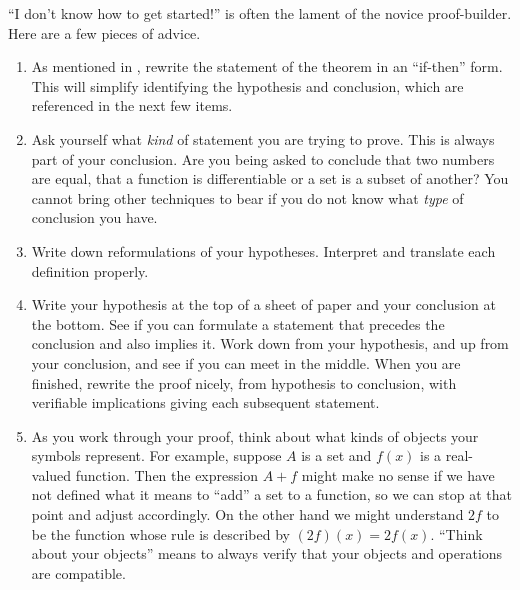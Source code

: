 ``I don't know how to get started!'' is often the lament of the novice proof-builder.  Here are a few pieces of advice.
%
\begin{enumerate}
%
\item  As mentioned in , rewrite the statement of the theorem in an ``if-then'' form.  This will simplify identifying the hypothesis and conclusion, which are referenced in the next few items.
%
\item  Ask yourself what {\em kind} of statement you are trying to prove.  This is always part of your conclusion.  Are you being asked to conclude that two numbers are equal, that a function is differentiable or a set is a subset of another?  You cannot bring other techniques to bear if you do not know what {\em type} of conclusion you have.
%
\item  Write down reformulations of your hypotheses.  Interpret and translate each definition properly.
%
\item Write your hypothesis at the top of a sheet of paper and your conclusion at the bottom.  See if you can formulate a statement that precedes the conclusion and also implies it.  Work down from your hypothesis, and up from your conclusion, and see if you can meet in the middle.  When you are finished, rewrite the proof nicely, from hypothesis to conclusion, with verifiable implications giving each subsequent statement.
%
\item As you work through your proof, think about what kinds of objects your symbols represent.  For example, suppose $A$ is a set and $f(x)$ is a real-valued function.  Then the expression $A+f$ might make no sense if we have not defined what it means to ``add'' a set to a function, so we can stop at that point and adjust accordingly.  On the other hand we might understand $2f$ to be the function whose rule is described by $(2f)(x)=2f(x)$.  ``Think about your objects'' means to always verify that your objects and operations are compatible.
%
\end{enumerate}
